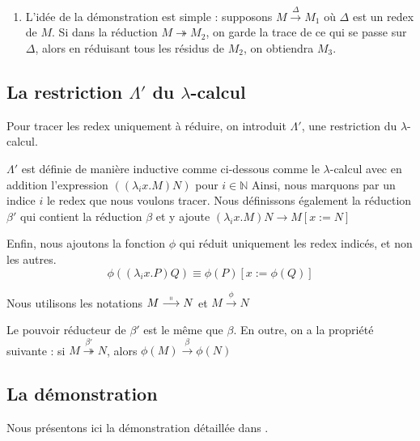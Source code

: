 \begin{enumerate}
\begin{center}
\end{center}

\item L'idée de la démonstration est simple : supposons $M \stackrel{\Delta}{\rightarrow} M_1  $ où
$\Delta$ est un redex de $M$. Si dans la réduction $M\twoheadrightarrow M_2$, on garde la trace de ce qui se passe
sur $\Delta$, alors en réduisant tous les résidus de $M_2$, on obtiendra $M_3$.
\end{enumerate}

\subsection{La restriction $\Lambda '$ du $\lambda$-calcul}
Pour tracer les redex uniquement à réduire, on introduit $\Lambda '$, une restriction du $\lambda$-calcul.


$\Lambda '$ est définie de manière inductive comme ci-dessous comme le $\lambda$-calcul avec en addition
l'expression $((\lambda _i x.M)N)$ pour $i \in \mathbb{N}$
Ainsi, nous marquons par un indice $i$ le redex que nous voulons tracer.
Nous définissons également la réduction $\beta '$  qui contient la réduction $\beta$ et y ajoute 
$(\lambda_i x.M)N \rightarrow M [x:=N]$

Enfin, nous ajoutons la fonction $\phi$ qui réduit uniquement les redex indicés, et non les autres.
$$\phi ((\lambda _i x.P)Q) \equiv \phi (P) [x:=\phi(Q)]$$

Nous utilisons les notations $M\stackrel{\shortparallel }{\longrightarrow} N$
et $M\stackrel{\phi } {\longrightarrow}N$

Le pouvoir réducteur de $\beta '$ est le même que $\beta$.
En outre, on a la propriété suivante : si $M \stackrel{\beta '}{\twoheadrightarrow} N$,
alors   $\phi(M) \stackrel{\beta}{\longrightarrow} \phi (N)$ 

\subsection{La démonstration}
Nous présentons ici la démonstration détaillée dans \cite{baren_bible}.

